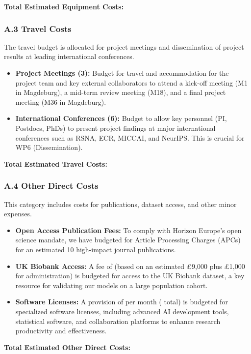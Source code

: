 \textbf{Total Estimated Equipment Costs: }

\subsubsection*{A.3 Travel Costs}
The travel budget is allocated for project meetings and dissemination of project results at leading international conferences.
\begin{itemize}
    \item \textbf{Project Meetings (3):} Budget for travel and accommodation for the project team and key external collaborators to attend a kick-off meeting (M1 in Magdeburg), a mid-term review meeting (M18), and a final project meeting (M36 in Magdeburg).
    \item \textbf{International Conferences (6):} Budget to allow key personnel (PI, Postdocs, PhDs) to present project findings at major international conferences such as RSNA, ECR, MICCAI, and NeurIPS. This is crucial for WP6 (Dissemination).
\end{itemize}

\textbf{Total Estimated Travel Costs: }

\subsubsection*{A.4 Other Direct Costs}
This category includes costs for publications, dataset access, and other minor expenses.
\begin{itemize}
    \item \textbf{Open Access Publication Fees:} To comply with Horizon Europe's open science mandate, we have budgeted for Article Processing Charges (APCs) for an estimated 10 high-impact journal publications.
    \item \textbf{UK Biobank Access:} A fee of  (based on an estimated \pounds9,000 plus \pounds1,000 for administration) is budgeted for access to the UK Biobank dataset, a key resource for validating our models on a large population cohort.
    \item \textbf{Software Licenses:} A provision of  per month ( total) is budgeted for specialized software licenses, including advanced AI development tools, statistical software, and collaboration platforms to enhance research productivity and effectiveness.
\end{itemize}

\textbf{Total Estimated Other Direct Costs: }

